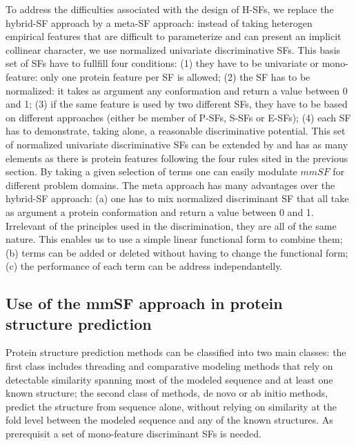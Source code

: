 \documentclass[a4paper,20pt,notitlepage,openbib]{article}
\begin{document}
To address the difficulties associated with the design of H-SFs, we replace the hybrid-SF approach by a meta-SF approach: instead of taking heterogen empirical features that are difficult to parameterize and can present an implicit collinear character, we use normalized univariate discriminative SFs. This basis set of SFs have to fullfill four conditions: (1) they have to be univariate or mono-feature: only one protein feature per SF is allowed; (2) the SF has to be normalized: it takes as argument any conformation and return a value between 0 and 1; (3) if the same feature is used by two different SFs, they have to be based on different approaches (either be member of P-SFs, S-SFs or E-SFs); (4) each SF has to demonstrate, taking alone, a reasonable discriminative potential.
This set of normalized univariate discriminative SFs can be extended by and has as many elements as there is protein features following the four rules sited in the previous section. By taking a given selection of terms one can easily modulate $mmSF$ for different problem domains.
The meta approach has many advantages over the hybrid-SF approach: (a) one has to mix normalized discriminant SF that all take as argument a protein conformation and return a value between 0 and 1. Irrelevant of the principles used in the discrimination, they are all of the same nature. This enables us to use a simple linear functional form to combine them; (b) terms can be added or deleted without having to change the functional form; (c) the performance of each term can be address independantelly.
\subsection{Use of the mmSF approach in protein structure prediction}
Protein structure prediction methods can be classified into two main classes: the first class includes threading and comparative modeling methods that rely on detectable similarity spanning most of the modeled sequence and at least one known structure; the second class of methods, de novo or ab initio methods, predict the structure from sequence alone, without relying on similarity at the fold level between the modeled sequence and any of the known structures. As prerequisit a set of mono-feature discriminant SFs is needed.
\end{document}
